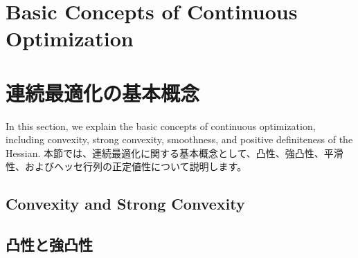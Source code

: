 \documentclass[0_main]{subfiles}
\begin{document}
\ifEn
    \section{Basic Concepts of Continuous Optimization}
\else
    \section{連続最適化の基本概念}
\fi
\label{sec:background_basic}

\ifEn
    In this section, we explain the basic concepts of continuous optimization, including convexity, strong convexity, smoothness, and positive definiteness of the Hessian.
\else
    本節では、連続最適化に関する基本概念として、凸性、強凸性、平滑性、およびヘッセ行列の正定値性について説明します。
\fi

\ifEn
    \subsection{Convexity and Strong Convexity}
\else
    \subsection{凸性と強凸性}
\fi
\end{document}
